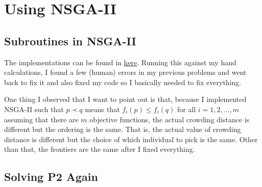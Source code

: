 \section{Using NSGA-II}

\subsection{Subroutines in NSGA-II}

The implementations can be found in \href{https://github.com/nngerncham/ma395_heuristic/blob/main/homework/hw5/code/code/nsga2.py}{here}. Running this against my hand calculations, I found a few (human) errors in my previous problems and went back to fix it and also fixed my code so I basically needed to fix everything.

One thing I observed that I want to point out is that, because I implemented NSGA-II such that \(p \prec q\) means that \(f_i(p) \leq f_i(q)\) for all \(i = 1, 2, ..., m\) assuming that there are \(m\) objective functions, the actual crowding distance is different but the ordering is the same. That is, the actual value of crowding distance is different but the choice of which individual to pick is the same. Other than that, the frontiers are the same after I fixed everything.

\subsection{Solving P2 Again}

